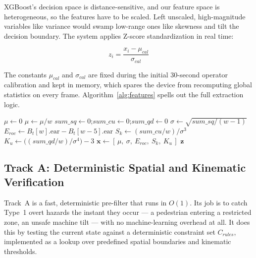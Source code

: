 XGBoost's decision space is distance-sensitive, and our feature space is
heterogeneous, so the features have to be scaled. Left unscaled, high-magnitude
variables like variance would swamp low-range ones like skewness and tilt the
decision boundary. The system applies Z-score standardization in real time:

\begin{equation}
z_i = \frac{x_i - \mu_{cal}}{\sigma_{cal}}
\label{eq:zscore}
\end{equation}

The constants $\mu_{cal}$ and $\sigma_{cal}$ are fixed during the initial
30-second operator calibration and kept in memory, which spares the device from
recomputing global statistics on every frame. Algorithm~\ref{alg:features}
spells out the full extraction logic.

\begin{algorithm}[h]
\caption{Statistical Feature Extraction}
\label{alg:features}
$\mu \gets 0$\;
$\mu \gets \mu / w$\;
$\mathit{sum\_sq} \gets 0$;\quad $\mathit{sum\_cu} \gets 0$;\quad $\mathit{sum\_qd} \gets 0$\;
$\sigma \gets \sqrt{\mathit{sum\_sq} / (w - 1)}$\;
$E_{roc} \gets B_t[w].\mathrm{ear} - B_t[w-5].\mathrm{ear}$\;
$S_k \gets (\mathit{sum\_cu} / w) / \sigma^3$\;
$K_u \gets \big((\mathit{sum\_qd} / w) / \sigma^4\big) - 3$
$\mathbf{x} \gets [\,\mu,\ \sigma,\ E_{roc},\ S_k,\ K_u\,]$\;
\Return $\mathbf{z}$\;
\end{algorithm}

\subsection{Track A: Deterministic Spatial and Kinematic Verification}

Track~A is a fast, deterministic pre-filter that runs in $O(1)$. Its job is to
catch Type~1 overt hazards the instant they occur --- a pedestrian entering a
restricted zone, an unsafe machine tilt --- with no machine-learning overhead at
all. It does this by testing the current state against a deterministic
constraint set $C_{rules}$, implemented as a lookup over predefined spatial
boundaries and kinematic thresholds.

